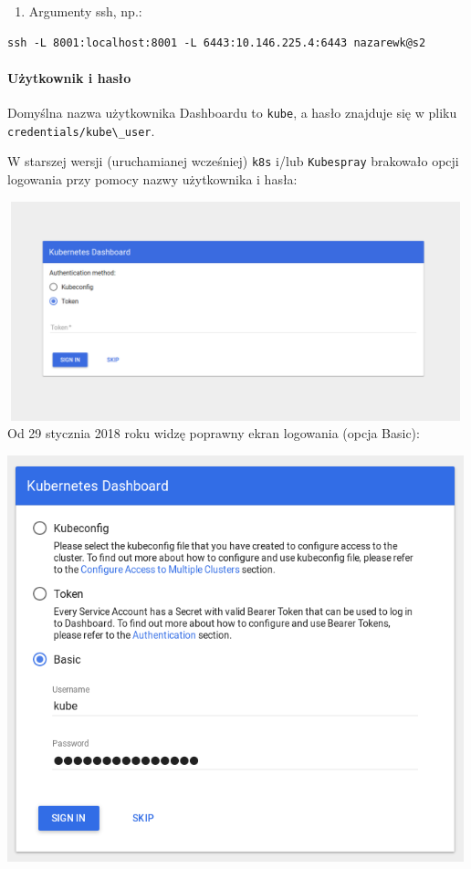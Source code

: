 \documentclass[a4paper,12pt,twoside,openany]{report}
\providecommand{\tightlist}{%
  \setlength{\itemsep}{0pt}\setlength{\parskip}{0pt}}
\newcommand{\passthrough}[1]{#1}
\begin{document}
\begin{enumerate}
\def\labelenumi{\arabic{enumi}.}
\setcounter{enumi}{1}
\tightlist
\item
  Argumenty ssh, np.:
\end{enumerate}

\begin{lstlisting}
ssh -L 8001:localhost:8001 -L 6443:10.146.225.4:6443 nazarewk@s2
\end{lstlisting}

\hypertarget{uux17cytkownik-i-hasux142o}{%
\paragraph{Użytkownik i hasło}\label{uux17cytkownik-i-hasux142o}}

Domyślna nazwa użytkownika Dashboardu to \passthrough{\lstinline!kube!},
a hasło znajduje się w pliku
\passthrough{\lstinline!credentials/kube\_user!}.

W starszej wersji (uruchamianej wcześniej) \passthrough{\lstinline!k8s!}
i/lub \passthrough{\lstinline!Kubespray!} brakowało opcji logowania przy
pomocy nazwy użytkownika i hasła:

\includegraphics[width=5.20833in,height=2.5in]{assets/dashboard-login-old.png}\\
Od 29 stycznia 2018 roku widzę poprawny ekran logowania (opcja Basic):

\includegraphics[width=5.20833in,height=4.63542in]{assets/dashboard-login-new.png}\\
\end{document}
